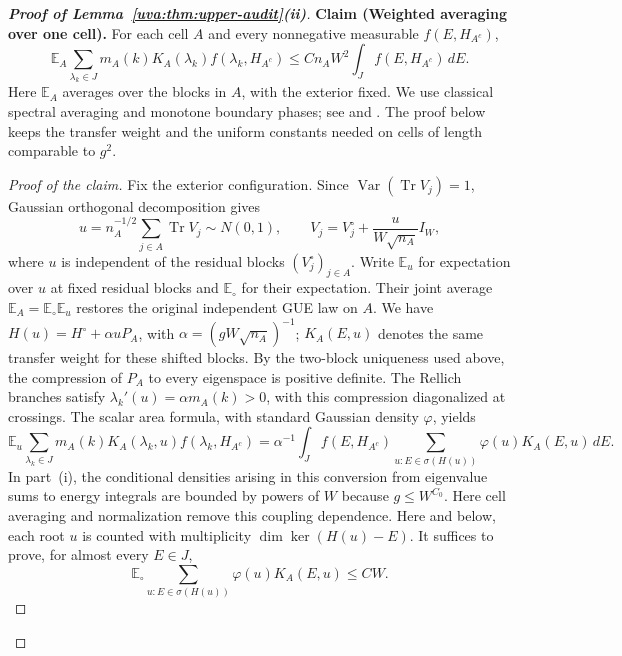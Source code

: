 \documentclass[11pt]{article}
\numberwithin{equation}{section}
\theoremstyle{remark}
\newcommand{\E}{\mathbb E}
\newcommand{\Tr}{\operatorname{Tr}}
\begin{document}
\begin{proof}[\textbf{Proof of Lemma~\ref{uva:thm:upper-audit}\textup{(ii)}}]
\medskip\noindent\textbf{Claim (Weighted averaging over one cell).}
For each cell $A$ and every nonnegative measurable $f(E,H_{A^c})$,
\begin{equation}\label{uva:eq:average}
 \E_A\sum_{\lambda_k\in J}
 m_A(k)K_A(\lambda_k) f(\lambda_k,H_{A^c})
 \le C n_AW^2\int_J f(E,H_{A^c})\,dE.
\end{equation}
Here $\E_A$ averages over the blocks in $A$, with the exterior fixed.
We use classical spectral averaging and monotone boundary phases;
see \cite[Appendix~A]{ASFH} and
\cite[Section~4, Theorem~5 and Lemma~2]{SSB-averaging}.
The proof below keeps the transfer weight and the uniform constants
needed on cells of length comparable to $g^2$.
\begin{proof}[Proof of the claim]
Fix the exterior configuration. Since $\operatorname{Var}(\Tr V_j)=1$,
Gaussian orthogonal decomposition gives
\[
 u=n_A^{-1/2}\sum_{j\in A}\Tr V_j\sim N(0,1),\qquad
 V_j=V_j^\circ+\frac{u}{W\sqrt{n_A}}I_W,
\]
where $u$ is independent of the residual blocks $(V_j^\circ)_{j\in A}$.
Write $\E_u$ for expectation over $u$ at fixed residual blocks and
$\E_\circ$ for their expectation. Their joint average
$\E_A=\E_\circ\E_u$ restores the original independent GUE law on $A$.
We have $H(u)=H^\circ+\alpha uP_A$, with $\alpha=(gW\sqrt{n_A})^{-1}$;
$K_A(E,u)$ denotes the same transfer weight for these shifted blocks.
By the two-block uniqueness used above, the compression of $P_A$
to every eigenspace is positive definite.
The Rellich branches satisfy $\lambda_k'(u)=\alpha m_A(k)>0$,
with this compression diagonalized at crossings. The scalar area
formula, with standard Gaussian density $\varphi$, yields
\begin{equation}\label{uva:eq:coarea-audit}
 \E_u\sum_{\lambda_k\in J}m_A(k)K_A(\lambda_k,u)f(\lambda_k,H_{A^c})
 =\alpha^{-1}\int_J f(E,H_{A^c})
 \sum_{u:E\in\sigma(H(u))}\varphi(u)K_A(E,u)\,dE.
\end{equation}
In part~\textup{(i)}, the conditional densities arising in this conversion
from eigenvalue sums to energy integrals are bounded by powers of $W$
because $g\le W^{C_0}$. Here cell averaging and normalization remove
this coupling dependence.
Here and below, each root $u$ is counted with multiplicity
$\dim\ker(H(u)-E)$. It suffices to prove, for almost every $E\in J$,
\begin{equation}\label{uva:eq:weighted-root-sum}
 \E_\circ\sum_{u:E\in\sigma(H(u))}
       \varphi(u)K_A(E,u)\le CW.
\end{equation}


\end{proof}
\end{proof}
\end{document}
